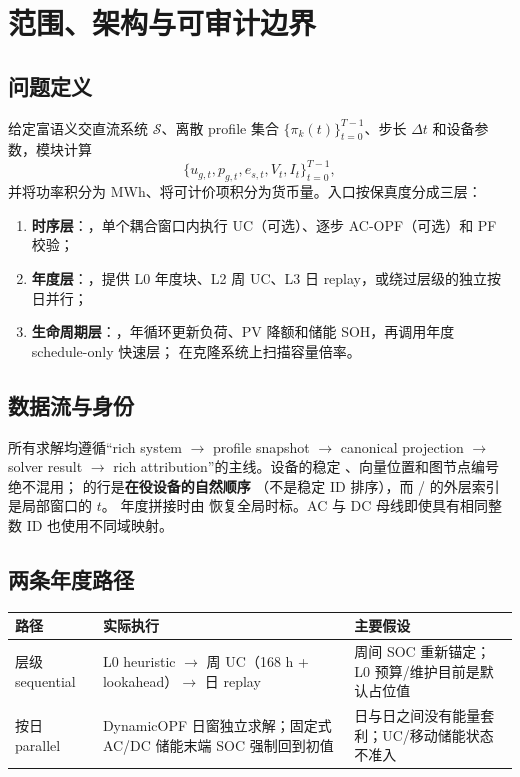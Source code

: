 \section{范围、架构与可审计边界}
\label{sec:ts-scope}

\subsection{问题定义}
给定富语义交直流系统 $\mathcal S$、离散 profile 集合
$\{\pi_k(t)\}_{t=0}^{T-1}$、步长 $\Delta t$ 和设备参数，模块计算
\[
  \{u_{g,t},p_{g,t},e_{s,t},V_t,I_t\}_{t=0}^{T-1},
\]
并将功率积分为 MWh、将可计价项积分为货币量。入口按保真度分成三层：
\begin{enumerate}
  \item \textbf{时序层}：，单个耦合窗口内执行
        UC（可选）、逐步 AC-OPF（可选）和 PF 校验；
  \item \textbf{年度层}：，提供
        L0 年度块、L2 周 UC、L3 日 replay，或绕过层级的独立按日并行；
  \item \textbf{生命周期层}：，年循环更新负荷、PV
        降额和储能 SOH，再调用年度 schedule-only 快速层；
        在克隆系统上扫描容量倍率。
\end{enumerate}

\subsection{数据流与身份}
所有求解均遵循“rich system $\rightarrow$ profile snapshot $\rightarrow$ canonical projection
$\rightarrow$ solver result $\rightarrow$ rich attribution”的主线。设备的稳定
、向量位置和图节点编号绝不混用； 的行是\textbf{在役设备的自然顺序}
（不是稳定 ID 排序），而 / 的外层索引是局部窗口的 $t$。
年度拼接时由  恢复全局时标。AC 与 DC 母线即使具有相同整数
ID 也使用不同域映射。

\subsection{两条年度路径}
\begin{center}\footnotesize
\begin{tabular}{@{}L{3.3cm}L{5.2cm}L{5.8cm}@{}}
\toprule
路径 & 实际执行 & 主要假设\\ \midrule
层级 sequential & L0 heuristic $\rightarrow$ 周 UC（168 h + lookahead）$\rightarrow$ 日 replay & 周间 SOC 重新锚定；L0 预算/维护目前是默认占位值\\
按日 parallel & DynamicOPF 日窗独立求解；固定式 AC/DC 储能末端 SOC 强制回到初值 & 日与日之间没有能量套利；UC/移动储能状态不准入\\
\bottomrule
\end{tabular}
\end{center}

